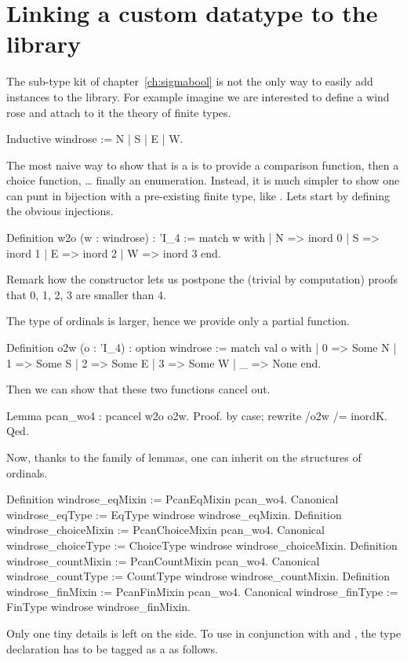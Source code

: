 \section{Linking a custom datatype to the library}

The sub-type kit of chapter~\ref{ch:sigmabool} is not the only
way to easily add instances to the library.  For example
imagine we are interested to define a wind rose and attach
to it the theory of finite types.

\begin{coq}{}{}
Inductive windrose := N | S | E | W.
\end{coq}
The most naive way to show that  is a  is
to provide a comparison function, then a choice function, \ldots
finally an enumeration.  Instead, it is much simpler to show one
can punt  in bijection with a pre-existing finite type,
like .  Lets start by defining the obvious injections.

\begin{coq}{}{}
Definition w2o (w : windrose) : 'I_4 :=
  match w with
  | N => inord 0 | S => inord 1 | E => inord 2 | W => inord 3
  end.
\end{coq}
Remark how the  constructor lets us postpone
the (trivial by computation) proofs that 0, 1, 2, 3
are smaller than 4.

The type of ordinals is larger, hence we provide only a partial
function.

\begin{coq}{}{}
Definition o2w (o : 'I_4) : option windrose :=
  match val o with
  | 0 => Some N | 1 => Some S | 2 => Some E | 3 => Some W
  | _ => None
  end.	
\end{coq}
Then we can show that these two functions cancel out.

\begin{coq}{}{}
Lemma pcan_wo4 : pcancel w2o o2w.
Proof. by case; rewrite /o2w /= inordK. Qed.
\end{coq}
Now, thanks to the  family of lemmas, one
can inherit on  the structures of ordinals.

\begin{coq}{}{}
Definition windrose_eqMixin := PcanEqMixin pcan_wo4.
Canonical windrose_eqType := EqType windrose windrose_eqMixin.
Definition windrose_choiceMixin := PcanChoiceMixin pcan_wo4.
Canonical windrose_choiceType := ChoiceType windrose windrose_choiceMixin.
Definition windrose_countMixin := PcanCountMixin pcan_wo4.
Canonical windrose_countType := CountType windrose windrose_countMixin.
Definition windrose_finMixin := PcanFinMixin pcan_wo4.
Canonical windrose_finType := FinType windrose windrose_finMixin.	
\end{coq}
Only one tiny details is left on the side.  To use 
in conjunction with \C{\\in} and , the type declaration has
to be tagged as a  as follows.


